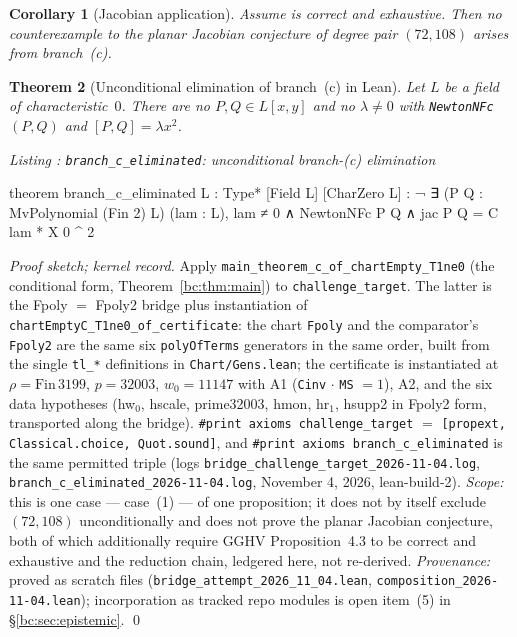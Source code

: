 \documentclass[a4paper,11pt]{article}
\newcounter{leanlisting}
\newenvironment{leanlisting}[2]{%
  \refstepcounter{leanlisting}\label{#2}%
  \begin{center}\textit{\small Listing \theleanlisting: #1}\end{center}%
  \Verbatim[breaklines=true,breakanywhere=true,fontsize=\footnotesize,frame=single,framesep=4pt,rulecolor=\color{gray!50},fillcolor=\color{gray!5}]%
}{%
  \endVerbatim%
}
\theoremstyle{plain}
\newtheorem{theorem}{Theorem}[section]
\newtheorem{corollary}[theorem]{Corollary}
\theoremstyle{definition}
\theoremstyle{remark}
\begin{document}
\begin{corollary}[Jacobian application]\label{bc:cor:gghv}
Assume \cite[Proposition~4.3]{GGHV} is correct and exhaustive. Then no counterexample to the planar Jacobian conjecture of degree pair $(72,108)$ arises from branch~(c).
\end{corollary}

\begin{theorem}[Unconditional elimination of branch~(c) in Lean]\label{bc:thm:unconditional}
Let $L$ be a field of characteristic~$0$. There are no $P,Q\in L[x,y]$ and no $\lambda\ne0$ with \texttt{NewtonNFc}$(P,Q)$ and $[P,Q]=\lambda x^2$.
\end{theorem}

\begin{leanlisting}{\texttt{branch\_c\_eliminated}: unconditional branch-(c) elimination}{bc:lst:unconditional}
theorem branch_c_eliminated
    {L : Type*} [Field L] [CharZero L] :
    ¬ ∃ (P Q : MvPolynomial (Fin 2) L) (lam : L),
      lam ≠ 0 ∧ NewtonNFc P Q ∧
      jac P Q = C lam * X 0 ^ 2
\end{leanlisting}

\emph{Proof sketch; kernel record.} Apply \texttt{main\_theorem\_c\_of\_chartEmpty\_T1ne0} (the conditional form, Theorem~\ref{bc:thm:main}) to \texttt{challenge\_target}. The latter is the Fpoly $=$ Fpoly2 bridge plus instantiation of \texttt{chartEmptyC\_T1ne0\_of\_certificate}: the chart \texttt{Fpoly} and the comparator's \texttt{Fpoly2} are the same six \texttt{polyOfTerms} generators in the same order, built from the single \texttt{tl\_*} definitions in \texttt{Chart/Gens.lean}; the certificate is instantiated at $\rho = \mathrm{Fin}\,3199$, $p = 32003$, $w_0 = 11147$ with A1 (\texttt{Cinv} $\cdot$ \texttt{MS} $= 1$), A2, and the six data hypotheses (hw$_0$, hscale, prime32003, hmon, hr$_1$, hsupp2 in Fpoly2 form, transported along the bridge). \texttt{\#print axioms challenge\_target} $=$ \texttt{[propext, Classical.choice, Quot.sound]}, and \texttt{\#print axioms branch\_c\_eliminated} is the same permitted triple (logs \texttt{bridge\_challenge\_target\_2026-11-04.log}, \texttt{branch\_c\_eliminated\_2026-11-04.log}, November 4, 2026, lean-build-2). \emph{Scope:} this is one case --- case~(1) --- of one proposition; it does not by itself exclude $(72,108)$ unconditionally and does not prove the planar Jacobian conjecture, both of which additionally require GGHV Proposition~4.3 to be correct and exhaustive and the reduction chain, ledgered here, not re-derived. \emph{Provenance:} proved as scratch files (\texttt{bridge\_attempt\_2026\_11\_04.lean}, \texttt{composition\_2026-11-04.lean}); incorporation as tracked repo modules is open item~(5) in \S\ref{bc:sec:epistemic}. \qed
\end{document}
